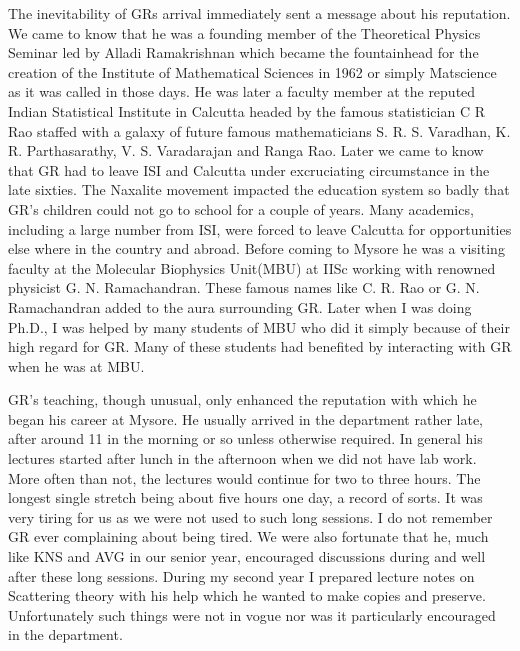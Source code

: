 The inevitability of GRs arrival immediately sent a message about his reputation. We came to know that he was a founding member of the Theoretical Physics Seminar led by Alladi Ramakrishnan which became the fountainhead for the creation of the Institute of Mathematical Sciences in 1962 or simply Matscience as it was called in those days. He was later a faculty member at the reputed Indian Statistical Institute in Calcutta headed by the famous statistician C R Rao staffed with a galaxy of future famous mathematicians S. R. S. Varadhan, K. R. Parthasarathy, V. S. Varadarajan and Ranga Rao. Later we came to know that GR had to leave ISI and Calcutta under excruciating circumstance in the late sixties. The Naxalite movement impacted the education system so badly that GR’s children could not go to school for a couple of years. Many academics, including a large number from ISI, were forced to leave Calcutta for opportunities else where in the country and abroad. Before coming to Mysore he was a visiting faculty at the Molecular Biophysics Unit(MBU) at IISc working with renowned physicist G. N. Ramachandran. These famous names like C. R. Rao or G. N. Ramachandran added to the aura surrounding GR. Later when I was doing Ph.D., I was helped by many students of MBU who did it simply because of their high regard for GR. Many of these students had benefited by interacting with GR when he was at MBU.

GR’s teaching, though unusual, only enhanced the reputation with which he began his career at Mysore. He usually arrived in the department rather late, after around 11 in the morning or so unless otherwise required. In general his lectures started after lunch in the afternoon when we did not have lab work. More often than not, the lectures would continue for two to three hours. The longest single stretch being about five hours one day, a record of sorts. It was very tiring for us as we were not used to such long sessions. I do not remember GR ever complaining about being tired. We were also fortunate that he, much like KNS and AVG in our senior year, encouraged discussions during and well after these long sessions. During my second year I prepared lecture notes on Scattering theory with his help which he wanted to make copies and preserve. Unfortunately such things were not in vogue nor was it particularly encouraged in the department.

